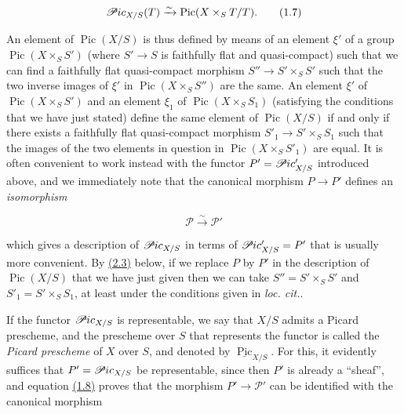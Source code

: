 \documentclass{article}
\newenvironment{eqenv}
  {}
  {}
\theoremstyle{definition}
\theoremstyle{definition}
\theoremstyle{definition}
\theoremstyle{definition}
\theoremstyle{remark}
\begin{document}
\leavevmode{}%
\begin{eqenv}
\[
  \mathscr{P}\kern -.5pt ic_{X/S}(T)
  \xrightarrow{\sim}\operatorname{Pic}(X\times_S T/T).
\tag{1.7}
\]

\end{eqenv}

An element of \(\operatorname{Pic}(X/S)\) is thus defined by means of an element \(\xi'\) of a group \(\operatorname{Pic}(X\times_S S')\) (where \(S'\to S\) is faithfully flat and quasi-compact) such that we can find a faithfully flat quasi-compact morphism \(S''\to S'\times_S S'\) such that the two inverse images of \(\xi'\) in \(\operatorname{Pic}(X\times_S S'')\) are the same.
An element \(\xi'\) of \(\operatorname{Pic}(X\times_S S')\) and an element \(\xi_1\) of \(\operatorname{Pic}(X\times_S S_1)\) (satisfying the conditions that we have just stated) define the same element of \(\operatorname{Pic}(X/S)\) if and only if there exists a faithfully flat quasi-compact morphism \(S'_1\to S'\times_S S_1\) such that the images of the two elements in question in \(\operatorname{Pic}(X\times_S S'_1)\) are equal.
It is often convenient to work instead with the functor \(P'=\mathscr{P}\kern -.5pt ic'_{X/S}\) introduced above, and we immediately note that the canonical morphism \(P\to P'\) defines an \emph{isomorphism}

\leavevmode{}%
\begin{eqenv}
\[
  {\mathscr{P}}
  \xrightarrow{\sim}{\mathscr{P}}'
\tag{1.8}
\]

\end{eqenv}

which gives a description of \(\mathscr{P}\kern -.5pt ic_{X/S}\) in terms of \(\mathscr{P}\kern -.5pt ic'_{X/S}=P'\) that is usually more convenient.
By \protect\hyperlink{fga-3-v-corollary-2.3}{(2.3)} below, if we replace \(P\) by \(P'\) in the description of \(\operatorname{Pic}(X/S)\) that we have just given then we can take \(S''=S'\times_S S'\) and \(S'_1=S'\times_S S_1\), at least under the conditions given in \emph{loc. cit.}.

If the functor \(\mathscr{P}\kern -.5pt ic_{X/S}\) is representable, we say that \(X/S\) admits a Picard prescheme, and the prescheme over \(S\) that represents the functor is called the \emph{Picard prescheme} of \(X\) over \(S\), and denoted by \(\underline{\operatorname{Pic}}_{X/S}\).
For this, it evidently suffices that \(P'=\mathscr{P}\kern -.5pt ic_{X/S}\) be representable, since then \(P'\) is already a ``sheaf'', and equation \protect\hyperlink{fga-3-v-equation-1.8}{(1.8)} proves that the morphism \(P'\to{\mathscr{P}}'\) can be identified with the canonical morphism
\end{document}
